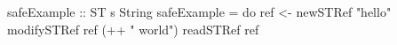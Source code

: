 \begin{code}
safeExample :: ST s String
safeExample = do
  ref <- newSTRef "hello"
  modifySTRef ref (++ " world")
  readSTRef ref
\end{code}
